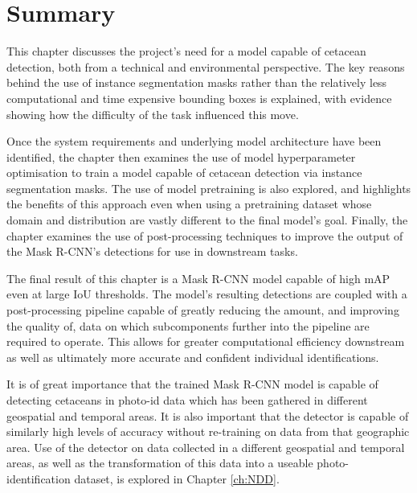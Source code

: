 \section{Summary}\label{ch:cetDet,sec:Summary}

This chapter discusses the project's need for a model capable of cetacean detection, both from a technical and environmental perspective. The key reasons behind the use of instance segmentation masks rather than the relatively less computational and time expensive bounding boxes is explained, with evidence showing how the difficulty of the task influenced this move. 

Once the system requirements and underlying model architecture have been identified, the chapter then examines the use of model hyperparameter optimisation to train a model capable of cetacean detection via instance segmentation masks. The use of model pretraining is also explored, and highlights the benefits of this approach even when using a pretraining dataset whose domain and distribution are vastly different to the final model's goal. Finally, the chapter examines the use of post-processing techniques to improve the output of the Mask R-CNN's detections for use in downstream tasks. 

The final result of this chapter is a Mask R-CNN model capable of high mAP even at large IoU thresholds. The model's resulting detections are coupled with a post-processing pipeline capable of greatly reducing the amount, and improving the quality of, data on which subcomponents further into the pipeline are required to operate. This allows for greater computational efficiency downstream as well as ultimately more accurate and confident individual identifications.

It is of great importance that the trained Mask R-CNN model is capable of detecting cetaceans in photo-id data which has been gathered in different geospatial and temporal areas. It is also important that the detector is capable of similarly high levels of accuracy without re-training on data from that geographic area. Use of the detector on data collected in a different geospatial and temporal areas, as well as the transformation of this data into a useable photo-identification dataset, is explored in Chapter \ref{ch:NDD}.



